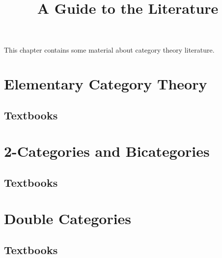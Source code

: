 

%



\title{A Guide to the Literature}

\maketitle

\label{section-phantom}

This chapter contains some material about category theory literature.

\ChapterTableOfContents

\section{Elementary Category Theory}\label{section-elementary-category-theory}
\subsection{Textbooks}\label{subsection-elementary-category-theory-textbooks}
\section{2-Categories and Bicategories}\label{section-two-categories-and-bicategories}
\subsection{Textbooks}\label{subsection-two-categories-and-bicategories-textbooks}
\section{Double Categories}\label{section-double-categories}
\subsection{Textbooks}\label{subsection-double-categories-textbooks}
\begin{appendices}

\end{appendices}

